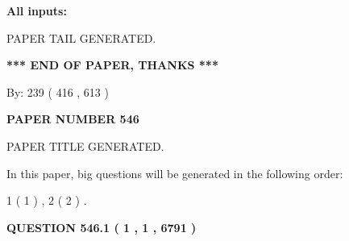 \documentclass[12pt]{article}
\begin{document}
   
   
   
\noindent{}
   
   
   
   
\noindent\vspace{0.1in}\hspace{-0.08in} {\textbf{\Large{All inputs: }}}
   
   
   
   
   
   
 \vspace{0.2in}
 
   
   
\vspace{2.0in} PAPER TAIL GENERATED.
   
   
   
   
\vspace{1.0in} 
{\textbf{\large{ *** END OF PAPER, THANKS *** }}} 
   
   
\hspace{1.0in} By: 
 239 ( 416 ,  613 )
   
   
   
   
\newpage 
\setcounter{page}{ 
   546001 } 
   
   
   
   
 {\textbf{ \Large{ PAPER NUMBER  546  }}}
   
   
\vspace{0.2in}
   
   
   
   
   
   
   
   
 \vspace{0.2in}
 
 
 
 
   
   
 PAPER TITLE GENERATED.
   
   
   
\vspace{0.2in}
   
In this paper, big questions will be generated in the following order: 
   
   
   1 ( 1 )
 ,
   2 ( 2 )
 .
  
\vspace{0.2in}
  
{\textbf{\Large{QUESTION
546.1 
 ( 1 , 1 , 6791 )
}}}
  
\end{document}
